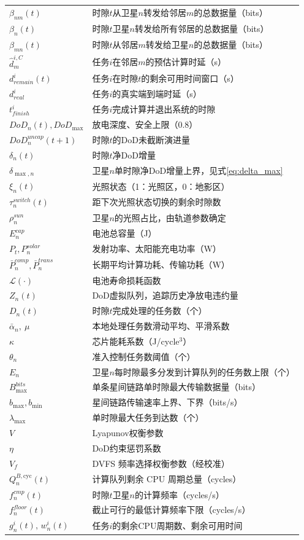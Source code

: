 \documentclass[a4paper,11pt]{article}
\begin{document}
\begin{table}[t]
\begin{tabular}{ll}
$\beta_{nm}(t)$ & 时隙$t$从卫星$n$转发给邻居$m$的总数据量（bits） \\
$\beta_n(t)$ & 时隙$t$卫星$n$转发给所有邻居的总数据量（bits） \\
$\beta_{mn}(t)$ & 时隙$t$从邻居$m$转发给卫星$n$的总数据量（bits） \\
$\hat{d}^{i,C}_m$ & 任务$i$在邻居$m$的预估计算时延（s） \\
$d^i_{remain}(t)$ & 任务$i$在时隙$t$的剩余可用时间窗口（s） \\
$d^i_{real}$ & 任务$i$的真实端到端时延（s） \\
$t^i_{finish}$ & 任务$i$完成计算并退出系统的时隙 \\
$DoD_n(t), DoD_{\max}$ & 放电深度、安全上限（0.8） \\
$DoD^{uncap}_n(t+1)$ & 时隙$t$的DoD未截断演进量 \\
$\delta_n(t)$ & 时隙$t$净DoD增量 \\
$\delta_{\max,n}$ & 卫星$n$单时隙净DoD增量上界，见式\eqref{eq:delta_max} \\
$\xi_n(t)$ & 光照状态（1：光照区，0：地影区） \\
$\tau^{switch}_n(t)$ & 距下次光照状态切换的剩余时隙数 \\
$\rho^{sun}_n$ & 卫星$n$的光照占比，由轨道参数确定 \\
$E^{cap}_n$ & 电池总容量（J） \\
$P_t, P^{solar}_n$ & 发射功率、太阳能充电功率（W） \\
$\bar{P}^{comp}_n, \bar{P}^{trans}_n$ & 长期平均计算功耗、传输功耗（W） \\
$\mathcal{L}(\cdot)$ & 电池寿命损耗函数 \\
$Z_n(t)$ & DoD虚拟队列，追踪历史净放电违约量 \\
$D_n(t)$ & 时隙$t$完成处理的任务数（个） \\
$\bar{\alpha}_n,~\mu$ & 本地处理任务数滑动平均、平滑系数 \\
$\kappa$ & 芯片能耗系数（J/cycle$^3$） \\
$\theta_n$ & 准入控制任务数阈值（个） \\
$E_n$ & 卫星$n$每时隙最多分发到计算队列的任务数上限（个） \\
$B^{bits}_{\max}$ & 单条星间链路单时隙最大传输数据量（bits） \\
$b_{\max}, b_{\min}$ & 星间链路传输速率上界、下界（bits/s） \\
$\lambda_{\max}$ & 单时隙最大任务到达数（个） \\
$V$ & Lyapunov权衡参数 \\
$\eta$ & DoD约束惩罚系数 \\
$V_f$ & DVFS 频率选择权衡参数（经校准） \\
$Q^{B,\mathrm{cyc}}_n(t)$ & 计算队列剩余 CPU 周期总量（cycles） \\
$f^{cmp}_n(t)$ & 时隙$t$卫星$n$的计算频率（cycles/s） \\
$f^{floor}_n(t)$ & 截止可行的最低计算频率下限（cycles/s） \\
$g^i_n(t),\,w^i_n(t)$ & 任务$i$的剩余CPU周期数、剩余可用时间 \\
\bottomrule
\end{tabular}
\end{table}
\end{document}
